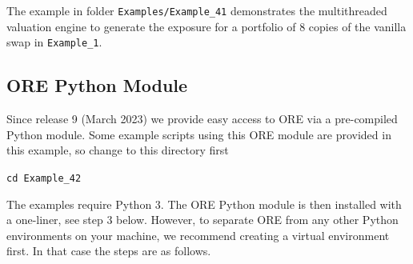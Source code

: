\documentclass[12pt, a4paper]{article}
\begin{document}
The example in folder {\tt Examples/Example\_41} demonstrates the multithreaded valuation engine to generate the exposure for a
portfolio of 8 copies of the vanilla swap in {\tt Example\_1}.

\subsection{ORE Python Module}%
\label{example:42}

Since release 9 (March 2023) we provide easy access to ORE via a pre-compiled Python module. Some example scripts using this ORE module are provided in this example, so change to this directory first

\medskip
{\tt cd Example\_42} 

\medskip
The examples require Python 3. The ORE Python module is then installed with a one-liner, see step 3 below. However, to separate ORE from any other Python environments on your machine, we recommend creating a virtual environment first. In that case the steps are as follows. 
\end{document}
